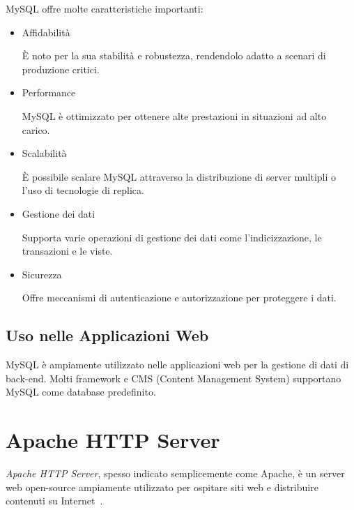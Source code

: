 MySQL offre molte caratteristiche importanti:
\begin{itemize}
    \item Affidabilità
    
    È noto per la sua stabilità e robustezza, rendendolo adatto a scenari di produzione critici.

    \item Performance
    
    MySQL è ottimizzato per ottenere alte prestazioni in situazioni ad alto carico.

    \item Scalabilità
    
    È possibile scalare MySQL attraverso la distribuzione di server multipli o l'uso di tecnologie di replica.

    \item Gestione dei dati
    
    Supporta varie operazioni di gestione dei dati come l'indicizzazione, le transazioni e le viste.

    \item Sicurezza
    
    Offre meccanismi di autenticazione e autorizzazione per proteggere i dati.
\end{itemize}

\subsection{Uso nelle Applicazioni Web}
MySQL è ampiamente utilizzato nelle applicazioni web per la gestione di dati di back-end. Molti framework e CMS (Content Management System) supportano MySQL come database predefinito.

\section{Apache HTTP Server}
\emph{Apache HTTP Server}, spesso indicato semplicemente come Apache, è un server web open-source ampiamente utilizzato per ospitare siti web e distribuire contenuti su Internet~\cite{XAMPP, APACHE}.

